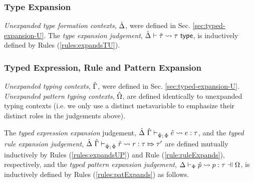 {{{{\subsubsection{Type Expansion}
\emph{Unexpanded type formation contexts}, $\hat{\Delta}$, were defined in Sec. \ref{sec:typed-expansion-U}. The \emph{type expansion judgement}, $\hat{\Delta} \vdash {\hat\tau} \leadsto \tau~\mathsf{type}$, is inductively defined by Rules (\ref{rules:expandsTU}).

\subsubsection{Typed Expression, Rule and Pattern Expansion}
\emph{Unexpanded typing contexts}, $\hat{\Gamma}$, were defined in Sec. \ref{sec:typed-expansion-U}. \emph{Unexpanded pattern typing contexts}, $\hat\Omega$, are defined identically to unexpanded typing contexts (i.e. we only use a distinct metavariable to emphasize their distinct roles in the judgements above). %

The \emph{typed expression expansion} judgement, $\hat{\Delta}~\hat{\Gamma} \vdash_{\hat{\Psi};\,\hat\Phi} {\hat e} \leadsto e : \tau$, and the \emph{typed rule expansion judgement}, $\hat{\Delta}~\hat{\Gamma} \vdash_{\hat{\Psi};\,\hat\Phi} \hat{r} \leadsto r : \tau \Mapsto \tau'$ are defined mutually inductively by Rules (\ref*{rules:expandsUP}) and Rule (\ref*{rule:ruleExpands}), respectively, and the \emph{typed pattern expansion judgement}, $\patExpands{\pctx}{\Phi}{\upv}{p}{\tau}$, is inductively defined by Rules (\ref*{rules:patExpands}) as follows.

}}}}

